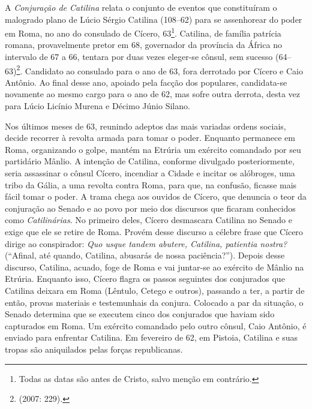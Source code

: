 





A \emph{Conjuração de Catilina} relata o conjunto de eventos que constituíram o
malogrado plano de Lúcio Sérgio Catilina (108--62) para se assenhorear do poder
em Roma, no ano do consulado de Cícero, 63\footnote{Todas as datas são antes de Cristo, salvo menção em contrário.}. Catilina, de família patrícia
romana, provavelmente pretor  em 68, governador da província da África no
intervalo de 67 a 66, tentara por duas vezes eleger-se cônsul, sem sucesso
(64--63)\footnote{ (2007: 229).}. Candidato ao consulado para o ano de
63, fora derrotado por Cícero e Caio Antônio. Ao final desse ano, apoiado pela
facção dos populares, candidata-se novamente ao mesmo cargo para o ano de 62,
mas sofre outra derrota, desta vez para Lúcio Licínio Murena e Décimo Júnio
Silano.

Nos últimos meses de 63, reunindo adeptos das mais variadas ordens sociais,
decide recorrer à revolta armada para tomar o poder. Enquanto permanece em
Roma, organizando o golpe, mantém na Etrúria um exército comandado por seu
partidário Mânlio. A intenção de Catilina, conforme divulgado posteriormente,
seria assassinar o cônsul Cícero, incendiar a Cidade e incitar os alóbroges,
uma tribo da Gália, a uma revolta contra Roma, para que, na confusão, ficasse
mais fácil tomar o poder. A trama chega aos ouvidos de Cícero, que denuncia o
teor da conjuração ao Senado e ao povo por meio dos discursos que ficaram
conhecidos como \emph{Catilinárias}. No primeiro deles, Cícero desmascara
Catilina no Senado e exige que ele se retire de Roma. Provém desse discurso a
célebre frase que Cícero dirige ao conspirador: \emph{Quo usque tandem abutere,
Catilina, patientia nostra? }(“Afinal, até quando, Catilina, abusarás de nossa
paciência?”).  Depois desse discurso, Catilina, acuado, foge de Roma e vai
juntar-se ao exército de Mânlio na Etrúria. Enquanto isso, Cícero flagra os
passos seguintes dos conjurados que Catilina deixara em Roma (Lêntulo, Cetego e
outros), passando a ter, a partir de então, provas materiais e testemunhais da
conjura. Colocado a par da situação, o Senado determina que se executem cinco
dos conjurados que haviam sido capturados em Roma.  Um exército comandado pelo
outro cônsul, Caio Antônio, é enviado para enfrentar Catilina.  Em fevereiro de
62, em Pistoia, Catilina e suas tropas são aniquilados pelas forças
republicanas. 

